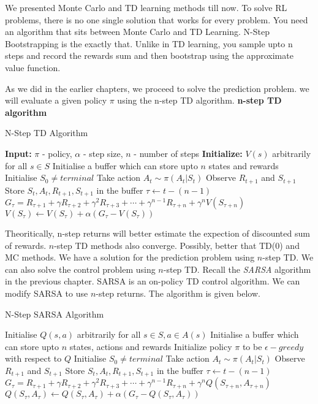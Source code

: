 \documentclass[../main.tex]{subfiles}
\begin{document}
We presented Monte Carlo and TD learning methods till now. To solve RL problems, there is no one single solution that works for every problem. You need an algorithm that sits between Monte Carlo and TD Learning. N-Step Bootstrapping is the exactly that. Unlike in TD learning, you sample upto n steps and record the rewards sum and then bootstrap using the approximate value function.

As we did in the earlier chapters, we proceed to solve the prediction problem. we will evaluate a given policy $\pi$ using the n-step  TD algorithm.
\textbf{n-step TD  algorithm}

\begin{algorithm} [H]
\caption{N-Step TD Algorithm}
\label{alg:nstep_td}
\begin{algorithmic}[1]
\State \textbf{Input:} $\pi$ - policy, $\alpha$ - step size, $n$ - number of steps
\State \textbf{Initialize:} $V(s)$ arbitrarily for all $s \in S$
\State Initialise a buffer which can store upto $n$ states and rewards
\State Initialise $S_0 \neq terminal $ 
\State Take action $A_t \sim \pi(A_t|S_t)$
\State Observe $R_{t+1}$ and $S_{t+1}$
\State Store $S_t, A_t, R_{t+1}, S_{t+1}$ in the buffer
\State $\tau \gets t - (n - 1)$
\State $G_\tau = R_{\tau+1} + \gamma R_{\tau+2} + \gamma^2 R_{\tau+3} + \cdots + \gamma^{n-1} R_{\tau+n} + \gamma^n V(S_{\tau+n})$
\State $V(S_\tau) \leftarrow V(S_\tau) + \alpha (G_\tau - V(S_\tau))$
\EndIf
\EndFor
\EndWhile

\end{algorithmic}
\end{algorithm}


Theoritically, n-step returns will better estimate the expection of discounted sum of rewards. $n$-step TD methods also converge. Possibly, better that TD(0) and MC methods.
We have a solution for the prediction problem using $n$-step TD. We can also solve the control problem using $n$-step TD. Recall the \emph{SARSA} algorithm in the previous chapter. SARSA is an on-policy TD control algorithm. We can modify SARSA to use $n$-step returns. The algorithm is given below.

\begin{algorithm}[H]
\caption{N-Step SARSA Algorithm}
\label{alg:nstep_sarsa}
\begin{algorithmic}[1]
\State Initialise $Q(s,a)$ arbitrarily for all $s \in S, a \in A(s)$
\State Initialise a buffer which can store upto $n$ states, actions and rewards
\State Initialize policy $\pi$ to be  $\epsilon-greedy$ with respect to $Q$
\State Initialise $S_0 \neq terminal $
\State Take action $A_t \sim \pi(A_t|S_t)$
\State Observe $R_{t+1}$ and $S_{t+1}$
\State Store $S_t, A_t, R_{t+1}, S_{t+1}$ in the buffer
\State $\tau \gets t - (n - 1)$
\State $G_\tau = R_{\tau+1} + \gamma R_{\tau+2} + \gamma^2 R_{\tau+3} + \cdots + \gamma^{n-1} R_{\tau+n} + \gamma^n Q(S_{\tau+n}, A_{\tau+n})$
\State $Q(S_\tau, A_\tau) \leftarrow Q(S_\tau, A_\tau) + \alpha (G_\tau - Q(S_\tau, A_\tau))$
\EndIf
\EndFor
\EndWhile
\end{algorithmic}
\end{algorithm}
\end{document}
